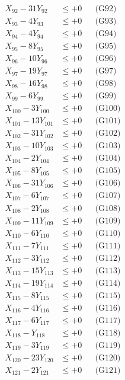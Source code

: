 \documentclass[a4paper,10pt]{article}
\begin{document}
{\begin{align}
X_{92} - 31Y_{92} &\leq +0 && \text{(G92)} \\
X_{93} - 4Y_{93} &\leq +0 && \text{(G93)} \\
\allowbreak
X_{94} - 4Y_{94} &\leq +0 && \text{(G94)} \\
X_{95} - 8Y_{95} &\leq +0 && \text{(G95)} \\
X_{96} - 10Y_{96} &\leq +0 && \text{(G96)} \\
X_{97} - 19Y_{97} &\leq +0 && \text{(G97)} \\
X_{98} - 16Y_{98} &\leq +0 && \text{(G98)} \\
X_{99} - 6Y_{99} &\leq +0 && \text{(G99)} \\
X_{100} - 3Y_{100} &\leq +0 && \text{(G100)} \\
X_{101} - 13Y_{101} &\leq +0 && \text{(G101)} \\
X_{102} - 31Y_{102} &\leq +0 && \text{(G102)} \\
X_{103} - 10Y_{103} &\leq +0 && \text{(G103)} \\
\allowbreak
X_{104} - 2Y_{104} &\leq +0 && \text{(G104)} \\
X_{105} - 8Y_{105} &\leq +0 && \text{(G105)} \\
X_{106} - 31Y_{106} &\leq +0 && \text{(G106)} \\
X_{107} - 6Y_{107} &\leq +0 && \text{(G107)} \\
X_{108} - 2Y_{108} &\leq +0 && \text{(G108)} \\
X_{109} - 11Y_{109} &\leq +0 && \text{(G109)} \\
X_{110} - 6Y_{110} &\leq +0 && \text{(G110)} \\
X_{111} - 7Y_{111} &\leq +0 && \text{(G111)} \\
X_{112} - 3Y_{112} &\leq +0 && \text{(G112)} \\
X_{113} - 15Y_{113} &\leq +0 && \text{(G113)} \\
\allowbreak
X_{114} - 19Y_{114} &\leq +0 && \text{(G114)} \\
X_{115} - 8Y_{115} &\leq +0 && \text{(G115)} \\
X_{116} - 4Y_{116} &\leq +0 && \text{(G116)} \\
X_{117} - 6Y_{117} &\leq +0 && \text{(G117)} \\
X_{118} - Y_{118} &\leq +0 && \text{(G118)} \\
X_{119} - 3Y_{119} &\leq +0 && \text{(G119)} \\
X_{120} - 23Y_{120} &\leq +0 && \text{(G120)} \\
X_{121} - 2Y_{121} &\leq +0 && \text{(G121)} \\

\end{align}}
\end{document}
